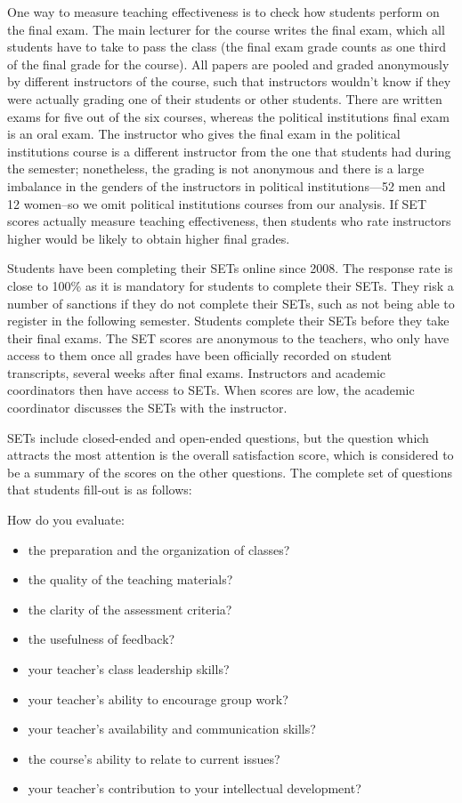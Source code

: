 \documentclass[12pt]{article}
\begin{document}
One way to measure teaching effectiveness is to check how students perform on the final exam. 
The main lecturer for the course writes the final exam, which all students have to take to pass the class 
(the final exam grade counts as one third of the final grade for the course). 
All papers are pooled and graded anonymously by different instructors of the course, such that instructors wouldn't know 
if they were actually grading one of their students or other students. 
There are written exams for five out of the six 
courses, whereas the political institutions final exam is an oral exam. 
The instructor who gives the final exam in the 
political institutions course is a different instructor from the one that students had during the semester;
nonetheless, the grading is not anonymous and there is a large imbalance in the genders of the
instructors in political institutions---52 men and 12 women--so we omit political institutions courses
from our analysis.
If SET scores actually measure teaching effectiveness, then students who rate instructors 
higher would be likely to obtain higher final grades. 

Students have been completing their SETs online since 2008. 
The response rate is close to 100\% as it is mandatory for 
students to complete their SETs. 
They risk a number of sanctions if they do not complete their SETs, such as not being able 
to register in the following semester. Students complete their SETs 
before they take their final exams. The SET scores are
anonymous to the teachers, who only have access to them once all grades have been officially recorded on student transcripts, 
several weeks after final exams. Instructors and academic coordinators then have access to SETs. When scores are low, the 
academic coordinator discusses the SETs with the instructor.   

SETs include closed-ended and open-ended questions, but the question which attracts the most attention is the overall 
satisfaction score, which is considered to be a summary of the scores on the other questions. The complete set of questions 
that students fill-out is as follows:

How do you evaluate:
\begin{itemize}
\item the preparation and the organization of classes?    
\item the quality of the teaching materials?
\item the clarity of the assessment criteria?
\item the usefulness of feedback?
\item your teacher's class leadership skills?
\item your teacher's ability to encourage group work? 
\item your teacher's availability and communication skills?
\item the course's ability to relate to current issues?
\item your teacher's contribution to your intellectual development?
\end{itemize}
\end{document}
